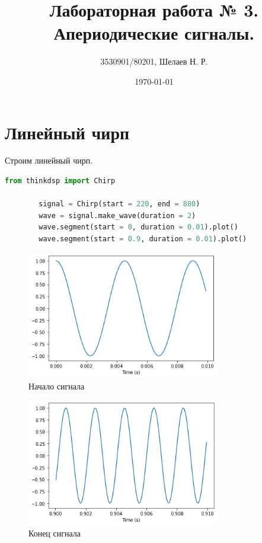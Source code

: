 \documentclass[a4paper, 12pt]{report}
\author{3530901/80201, Шелаев Н. Р.}
\title{Лабораторная работа № 3. Апериодические сигналы.}
\date{\today}
\begin{document}
	\maketitle
	\tableofcontents
	\listoffigures
	\lstlistoflistings

	\chapter{Линейный чирп}
	Строим линейный чирп.
	\begin{lstlisting}[language=Python,caption=Линейный чирп]
		from thinkdsp import Chirp

		signal = Chirp(start = 220, end = 880)
		wave = signal.make_wave(duration = 2)
		wave.segment(start = 0, duration = 0.01).plot()
		wave.segment(start = 0.9, duration = 0.01).plot()
	\end{lstlisting}
	\begin{figure}[H]
		\centering
		\includegraphics[width=0.75\textwidth]{chirp1.png}
		\caption{Начало сигнала}
		\label{fig:chirp1}
	\end{figure}
	\begin{figure}[H]
		\centering
		\includegraphics[width=0.75\textwidth]{chirp2.png}
		\caption{Конец сигнала}
		\label{fig:chirp2}
	\end{figure}
\end{document}
